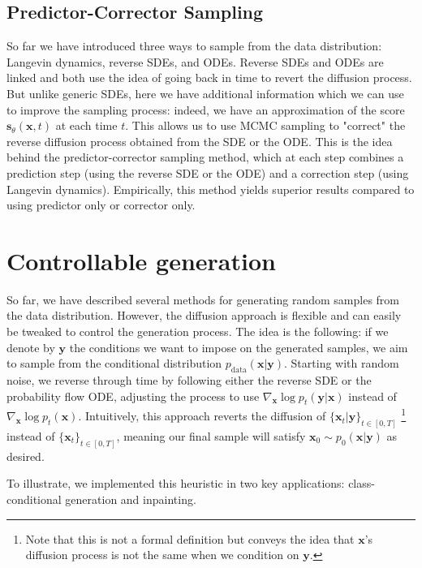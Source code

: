 \documentclass{article}
\begin{document}
\subsection{Predictor-Corrector Sampling}
So far we have introduced three ways to sample from the data distribution: Langevin dynamics, reverse SDEs, and ODEs.
Reverse SDEs and ODEs are linked and both use the idea of going back in time to revert the diffusion process. But unlike generic SDEs, here we have additional
information which we can use to improve the sampling process: indeed, we have an approximation of the score $\mathbf{s}_\theta(\mathbf{x}, t)$ at each time $t$.
This allows us to use MCMC sampling to "correct" the reverse diffusion process obtained from the SDE or the ODE. This is the idea behind the predictor-corrector sampling method,
which at each step combines a prediction step (using the reverse SDE or the ODE) and a correction step (using Langevin dynamics). Empirically, this method yields superior results 
compared to using predictor only or corrector only.

\section{Controllable generation}
So far, we have described several methods for generating random samples from the data distribution. However, the diffusion approach is flexible and can easily be tweaked to control the generation process. The idea is the following: if we denote by $\mathbf{y}$ the conditions we want to impose on the generated samples, we aim to sample from the conditional distribution \( p_\text{data}(\mathbf{x}|\mathbf{y}) \). Starting with random noise, we reverse through time by following either the reverse SDE or the probability flow ODE, adjusting the process to use \( \nabla_\mathbf{x} \log p_t(\mathbf{y}|\mathbf{x}) \) instead of \( \nabla_\mathbf{x} \log p_t(\mathbf{x}) \). Intuitively, this approach reverts the diffusion of $\{ \mathbf{x}_t|\mathbf{y}\}_{t\in[0,T]}$
\footnote{Note that this is not a formal definition but conveys the idea that $\mathbf{x}$'s diffusion process is not the same when we condition on $\mathbf{y}$.}
instead of $\{ \mathbf{x}_t\}_{t\in[0,T]}$, meaning our final sample will satisfy \( \mathbf{x}_0 \sim p_0(\mathbf{x}|\mathbf{y}) \) as desired.

To illustrate, we implemented this heuristic in two key applications: class-conditional generation and inpainting.
\end{document}
